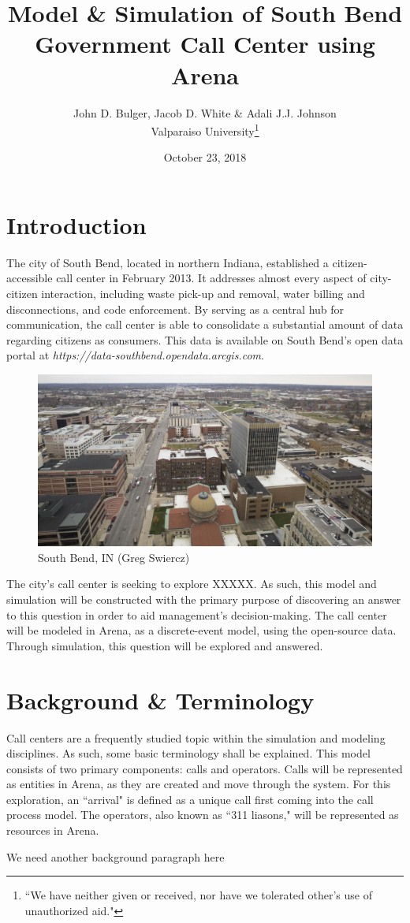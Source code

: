 \documentclass[12pt,twocolumn]{article}
\title{Model \& Simulation of South Bend Government Call Center using Arena}
\author{John D. Bulger, Jacob D. White \& Adali J.J. Johnson\\Valparaiso University\thanks{``We have neither given or received, nor have we tolerated other’s use of unauthorized aid."}}
\date{October 23, 2018}
\begin{document}
\maketitle

\section{Introduction}
The city of South Bend, located in northern Indiana, established a citizen-accessible call center in February 2013.  It addresses almost every aspect of city-citizen interaction, including waste pick-up and removal, water billing and disconnections, and code enforcement.  By serving as a central hub for communication, the call center is able to consolidate a substantial amount of data regarding citizens as consumers.  This data is available on South Bend's open data portal at \textit{https://data-southbend.opendata.arcgis.com}.

	\begin{figure}[h]
	\includegraphics[scale=.17]{south_bend.png}
	\caption{South Bend, IN (Greg Swiercz)}
	\end{figure}

\par
The city's call center is seeking to explore XXXXX.  As such, this model and simulation will be constructed with the primary purpose of discovering an answer to this question in order to aid management's decision-making.  The call center will be modeled in Arena, as a discrete-event model, using the open-source data.  Through simulation, this question will be explored and answered.

\section{Background \& Terminology}
Call centers are a frequently studied topic within the simulation and modeling disciplines.  As such, some basic terminology shall be explained.  This model consists of two primary components:  calls and operators.  Calls will be represented as entities in Arena, as they are created and move through the system.  For this exploration, an ``arrival" is defined as a unique call first coming into the call process model.  The operators, also known as ``311 liasons," will be represented as resources in Arena.
\par
We need another background paragraph here
\end{document}
